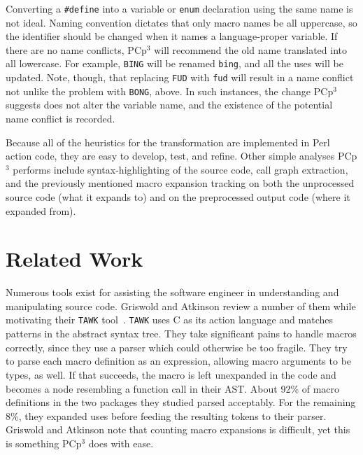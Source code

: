 \documentclass{article}
\newcommand{\pcp}{\mbox{\textsf{PCp}$^3$}}
\newcommand{\Perl}{\mbox{\textsf{Perl}}}
\newcommand{\C}{\mbox{\textsf{C}}}
\newcommand{\ppd}[1]{\texttt{\##1}}
\begin{document}
Converting a \ppd{define} into a variable or \texttt{enum} declaration
using the same name is not ideal.  Naming convention dictates that only
macro names be all uppercase, so the identifier should be changed when it
names a language-proper variable.  If there are no name conflicts, \pcp{} will recommend
the old name translated into all lowercase.  For example, \texttt{BING} will be renamed
\texttt{bing}, and all the uses will be updated.  Note, though, that
replacing \texttt{FUD} with \texttt{fud} will result in a name conflict
not unlike the problem with \texttt{BONG}, above.  In such instances,
the change \pcp{} suggests does not alter the variable name, and the
existence of the potential name conflict is recorded.


Because all of the heuristics for the transformation are implemented in
\Perl{} action code, they are easy to develop, test, and refine.  Other
simple analyses \pcp{}  performs include syntax-highlighting of
the source code, call graph extraction, and the previously mentioned
macro expansion tracking on both the unprocessed source code (what it
expands to) and on the preprocessed output code (where it expanded
from).

\section{Related Work}
\label{sec:related}
Numerous tools exist for assisting the software engineer in
understanding and manipulating source code.  Griswold and Atkinson
review a number of them while motivating their \texttt{TAWK} tool~\cite{Griswold96}.
\texttt{TAWK} uses \C{} as its action language and matches patterns in
the abstract syntax tree.  They take significant pains to handle macros
correctly, since they use a parser which could otherwise be too
fragile.  They try to parse each macro definition as an expression,
allowing macro arguments to be types, as well.  If that succeeds, the
macro is left unexpanded in the code and becomes a node resembling a
function call in their AST.  About 92\% of macro definitions in the two packages
they studied parsed acceptably.  For the remaining 8\%, they expanded
uses before feeding the resulting tokens to their parser.  Griswold and
Atkinson note that counting macro expansions is difficult, yet this is
something \pcp{} does with ease.
\end{document}
